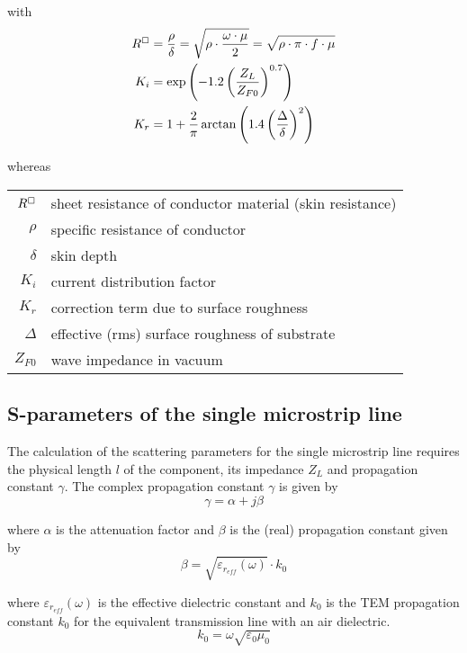 with
\begin{align}
R^{\boxempty} &= \dfrac{\rho}{\delta} = \sqrt{\rho\cdot\dfrac{\omega \cdot \mu}{2}} = \sqrt{\rho\cdot\pi\cdot f \cdot \mu}\\
\label{eq:HandJKi}
K_i &= \exp{\left(-1.2\left(\dfrac{Z_L}{Z_{F0}}\right)^{0.7}\right)}\\
K_r &= 1 + \dfrac{2}{\pi}\arctan{\left(1.4\left(\dfrac{\Delta}{\delta}\right)^2\right)}
\end{align}

whereas

\addvspace{12pt}

\begin{tabular}{rl}
$R^{\boxempty}$& sheet resistance of conductor material (skin resistance)\\
$\rho$& specific resistance of conductor\\
$\delta$& skin depth\\
$K_i$& current distribution factor\\
$K_r$& correction term due to surface roughness\\
$\Delta$& effective (rms) surface roughness of substrate\\
$Z_{F0}$& wave impedance in vacuum
\end{tabular}

\subsection{S-parameters of the single microstrip line}

The calculation of the scattering parameters for the single microstrip
line requires the physical length $l$ of the component, its impedance
$Z_L$ and propagation constant $\gamma$.  The complex propagation
constant $\gamma$ is given by
\begin{equation}
\gamma = \alpha + j\beta
\end{equation}

where $\alpha$ is the attenuation factor and $\beta$ is the (real)
propagation constant given by
\begin{equation}
\beta = \sqrt{\varepsilon_{r_{eff}}(\omega)} \cdot k_0
\end{equation}

where $\varepsilon_{r_{eff}}(\omega)$ is the effective dielectric
constant and $k_0$ is the TEM propagation constant $k_0$ for the
equivalent transmission line with an air dielectric.
\begin{equation}
k_0 = \omega \sqrt{\varepsilon_0 \mu_0}
\end{equation}

